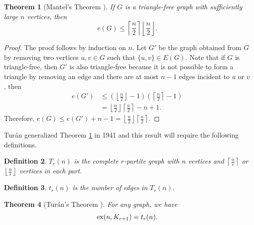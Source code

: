 \documentclass[12pt,twoside,a4paper,bibliography=totocnumbered]{book}
\numberwithin{equation}{section}
\newtheorem{theorem}             {Theorem}[section]
\newtheorem{definition}	[theorem] {Definition}
\theoremstyle{remark}
\def\ex{\mathop{\text{\rm ex}}\nolimits}
\begin{document}
\begin{theorem}[{Mantel's Theorem \cite{Ma07}}]\label{the:mantel}
If $G$ is a triangle-free graph with sufficiently large $n$ vertices, then 
$$e(G) \leq \left\lceil \frac{n}{2} \right\rceil \left\lfloor \frac{n}{2} \right\rfloor .$$
\end{theorem}
\begin{proof}
The proof follows by induction on $n$. Let $G'$ be the graph obtained from $G$ by removing two vertices $u,v \in G$ such that $\{u,v\}\in E(G)$. Note that if $G$ is triangle-free, then $G'$ is also triangle-free because it is not possible to form a triangle by removing an edge and there are at most $n-1$ edges incident to $u$ or $v$, then
\begin{align*}
e(G') &\leq \left(\left\lfloor \frac{n}{2} \right\rfloor -1\right)\left(\left\lceil \frac{n}{2} \right\rceil -1\right) \\
&= \left\lfloor \frac{n}{2} \right\rfloor \left\lceil \frac{n}{2} \right\rceil - n +1.
\end{align*}	
Therefore, $e(G) \leq e(G') + n-1 = \left\lfloor \frac{n}{2} \right\rfloor \left\lceil \frac{n}{2} \right\rceil$. 
\end{proof}

Turán generalized Theorem \ref{the:mantel} in 1941 and this result will require the following definitions. 
\begin{definition}$T_r(n)$ is the complete $r$-partite graph with $n$ vertices and $\left\lceil \frac{n}{r} \right\rceil$ or $\left\lfloor \frac{n}{r} \right\rfloor$ vertices in each part.
\end{definition}

\begin{definition}
$t_r(n)$ is the number of edges in $T_r(n)$.
\end{definition}

\begin{theorem}[{Turán's Theorem \cite{Tu41}}] \label{theorem:turan1941}%
For any graph, we have $$\ex(n, K_{r+1}) = t_r(n).$$
\end{theorem}
\end{document}
